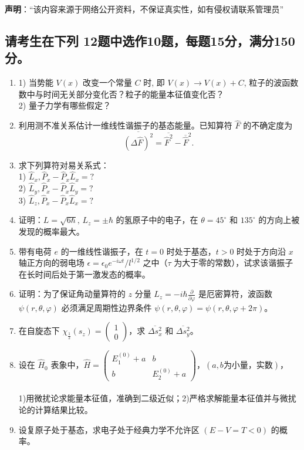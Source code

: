 
\textbf{声明}：“该内容来源于网络公开资料，不保证真实性，如有侵权请联系管理员”

\subsection{请考生在下列 12题中选作10题，每题15分，满分150分。}
\begin{enumerate}
    \item 1) 当势能 $V(x)$ 改变一个常量 $C$ 时, 即 $V(x) \rightarrow V(x) + C$, 粒子的波函数数中与时间无关部分变化否？粒子的能量本征值变化否？\\
   2) 量子力学有哪些假定？
    \item 利用测不准关系估计一维线性谐振子的基态能量。已知算符 $\hat{F}$ 的不确定度为
    \[
    \overline{(\Delta \hat{F})^2} = \overline{\hat{F}^2}-  \overline{\hat{F}} ^2.~
    \]
    \item 求下列算符对易关系式：\\
    1) $\hat{L}_x, \hat{P}_x - \hat{P}_x \hat{L}_x=?$\\
    2) $\hat{L}_y, \hat{P}_x - \hat{P}_x \hat{L}_y=?$\\
    3) $\hat{L}_z, \hat{P}_x - \hat{P}_x \hat{L}_x=?$\\
    \item 证明：$L = \sqrt{6\hbar}, \, L_z = \pm \hbar$ 的氢原子中的电子，在 $\theta = 45^\circ$ 和 $135^\circ$ 的方向上被发现的概率最大。
    \item 带有电荷 $e$ 的一维线性谐振子，在 $t = 0$ 时处于基态，$t > 0$ 时处于方向沿 $x$ 轴正方向的弱电场 $\epsilon = \epsilon_0 e^{-i\omega t}/l^{1/2}$ 之中（$\tau$ 为大于零的常数），试求该谐振子在长时间后处于第一激发态的概率。
    \item 证明：为了保证角动量算符的 $z$ 分量 $L_z = -i\hbar \frac{\partial}{\partial \varphi}$ 是厄密算符，波函数 $\psi(r, \theta, \varphi)$ 必须满足周期性边界条件 $\psi(r, \theta, \varphi) = \psi(r, \theta, \varphi + 2\pi)$。
    \item 在自旋态下 $\chi_{\frac{1}{2}}(s_z) = \begin{pmatrix} 1 \\ 0 \end{pmatrix}$，求 $\overline{\Delta s_x^2}$ 和 $\overline{\Delta s_y^2}$。
    \item 设在 $\hat H_0$ 表象中，$\hat{H} = \begin{pmatrix} E_1^{(0)} + a & b \\ b & E_2^{(0)} + a \end{pmatrix}$，$(a, b \text{为小量，实数})$，\\\\
    1)用微扰论求能量本征值，准确到二级近似；2)严格求解能量本征值并与微扰论的计算结果比较。\\
    \item 设复原子处于基态，求电子处于经典力学不允许区 $(E - V = T < 0)$ 的概率。
\end{enumerate}
